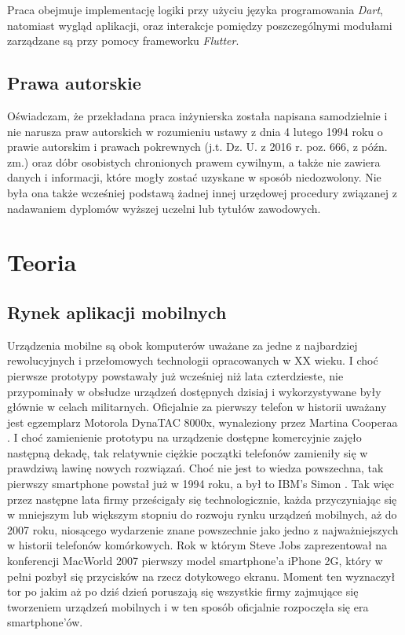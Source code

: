 \documentclass[12pt, a4paper]{article}
\begin{document}
\begin{sloppypar}
{{    Praca obejmuje implementację logiki przy użyciu języka programowania \emph{Dart},
    natomiast wygląd aplikacji, oraz interakcje pomiędzy poszczególnymi modułami
    zarządzane są przy pomocy frameworku \emph{Flutter}.
  }
  \subsection{Prawa autorskie}
  {
    Oświadczam, że przekładana praca inżynierska została napisana samodzielnie i nie narusza
    praw autorskich w rozumieniu ustawy z dnia 4 lutego 1994 roku o prawie autorskim
    i prawach pokrewnych (j.t. Dz. U. z 2016 r. poz. 666, z późn. zm.) oraz dóbr
    osobistych chronionych prawem cywilnym, a także nie zawiera danych i informacji,
    które mogły zostać uzyskane w sposób niedozwolony. Nie była ona także wcześniej podstawą
    żadnej innej urzędowej procedury związanej z nadawaniem dyplomów wyższej uczelni lub
    tytułów zawodowych.
  }
}

\section{Teoria}
{
  \subsection{Rynek aplikacji mobilnych}
  {
    Urządzenia mobilne są obok komputerów uważane za jedne z najbardziej rewolucyjnych
    i przełomowych technologii opracowanych w XX wieku. I choć pierwsze prototypy 
    powstawały już wcześniej niż lata czterdzieste, nie przypominały w obsłudze urządzeń
    dostępnych dzisiaj i wykorzystywane były głównie w celach militarnych.
    Oficjalnie za pierwszy telefon w historii uważany jest egzemplarz Motorola 
    DynaTAC 8000x, wynaleziony przez Martina Cooperaa \cite{history1}. I choć
    zamienienie prototypu na urządzenie dostępne
    komercyjnie zajęło następną dekadę, tak relatywnie ciężkie początki telefonów
    zamieniły się w prawdziwą lawinę nowych rozwiązań. Choć nie jest to wiedza
    powszechna, tak pierwszy smartphone powstał już w 1994 roku, a był to IBM's Simon
    \cite{history2}. Tak więc przez następne lata firmy prześcigały się technologicznie,
    każda przyczyniając się w mniejszym lub większym stopniu do rozwoju rynku urządzeń
    mobilnych, aż do 2007 roku, niosącego wydarzenie znane powszechnie jako jedno 
    z najważniejszych w historii telefonów komórkowych. Rok w którym Steve Jobs 
    zaprezentował na konferencji MacWorld 2007 pierwszy model smartphone'a iPhone 2G,
    który w pełni pozbył się przycisków na rzecz dotykowego ekranu. Moment ten wyznaczył
    tor po jakim aż po dziś dzień poruszają się wszystkie firmy zajmujące się tworzeniem
    urządzeń mobilnych i w ten sposób oficjalnie rozpoczęła się era smartphone'ów.

}}
\end{sloppypar}
\end{document}
